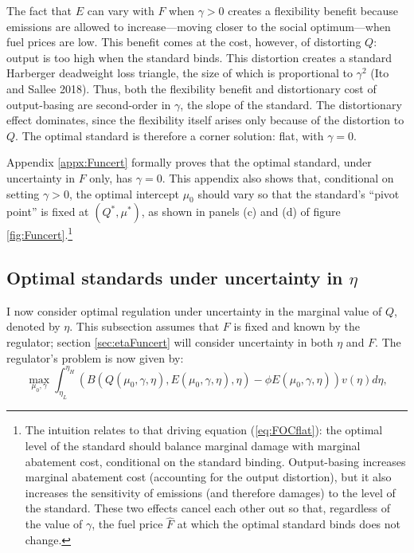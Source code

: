 \documentclass[12pt]{article}
\begin{document}
The fact that $E$ can vary with $F$ when $\gamma>0$ creates a flexibility benefit because emissions are allowed to increase---moving closer to the social optimum---when fuel prices are low. This benefit comes at the cost, however, of distorting $Q$: output is too high when the standard binds. This distortion creates a standard Harberger deadweight loss triangle, the size of which is proportional to $\gamma^2$ (Ito and Sallee 2018). Thus, both the flexibility benefit and distortionary cost of output-basing are second-order in $\gamma$, the slope of the standard. The distortionary effect dominates, since the flexibility itself arises only because of the distortion to $Q$. The optimal standard is therefore a corner solution: flat, with $\gamma=0$.

Appendix \ref{appx:Funcert} formally proves that the optimal standard, under uncertainty in $F$ only, has $\gamma=0$. This appendix also shows that, conditional on setting $\gamma>0$, the optimal intercept $\mu_0$ should vary so that the standard's ``pivot point'' is fixed at $(Q^*,\mu^*)$, as shown in panels (c) and (d) of figure \ref{fig:Funcert}.\footnote{The intuition relates to that driving equation (\ref{eq:FOCflat}): the optimal level of the standard should balance marginal damage with marginal abatement cost, conditional on the standard binding. Output-basing increases marginal abatement cost (accounting for the output distortion), but it also increases the sensitivity of emissions (and therefore damages) to the level of the standard. These two effects cancel each other out so that, regardless of the value of $\gamma$, the fuel price $\hat{F}$ at which the optimal standard binds does not change.}



\subsection{Optimal standards under uncertainty in $\eta$} \label{sec:etauncert}

I now consider optimal regulation under uncertainty in the marginal value of $Q$, denoted by $\eta$. This subsection assumes that $F$ is fixed and known by the regulator; section \ref{sec:etaFuncert} will consider uncertainty in both $\eta$ and $F$. The regulator's problem is now given by:
\begin{equation}
\max_{\mu_0,\gamma} \int_{\eta_L}^{\eta_H}\left(B(Q(\mu_0,\gamma,\eta),E(\mu_0,\gamma,\eta),\eta)-\phi E(\mu_0,\gamma,\eta)\right)v(\eta)d\eta, \label{eq:RegProbEtauncert}
\end{equation}
\end{document}
